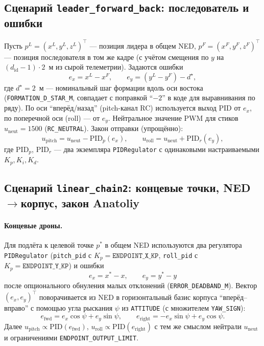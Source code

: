 \documentclass[12pt,a4paper]{article}
\begin{document}
\subsection{Сценарий \texttt{leader\_forward\_back}: последователь и ошибки}

Пусть $p^L = (x^L, y^L, z^L)^\top$ --- позиция лидера в общем NED, $p^F = (x^F, y^F, z^F)^\top$ --- позиция последователя в том же кадре (с учётом смещения по $y$ на $(d_{\mathrm{id}}-1)\cdot 2$~м из сырой телеметрии). Задаются ошибки
\begin{equation}
  e_x = x^L - x^F, \qquad
  e_y = (y^L - y^F) - d^\star,
\end{equation}
где $d^\star = 2$~м --- номинальный шаг формации вдоль оси востока (\texttt{FORMATION\_D\_STAR\_M}, совпадает с поправкой ``$-2$'' в коде для выравнивания по ряду). По оси ``вперёд/назад'' (pitch-канал RC) используется выход PID от $e_x$, по поперечной оси (roll) --- от $e_y$. Нейтральное значение PWM для стиков $u_{\mathrm{neut}} = 1500$ (\texttt{RC\_NEUTRAL}). Закон отправки (упрощённо):
\begin{equation}
  u_{\mathrm{pitch}} = u_{\mathrm{neut}} - \mathrm{PID}_p(e_x), \qquad
  u_{\mathrm{roll}} = u_{\mathrm{neut}} + \mathrm{PID}_r(e_y),
\end{equation}
где $\mathrm{PID}_p$, $\mathrm{PID}_r$ --- два экземпляра \texttt{PIDRegulator} с одинаковыми настраиваемыми $K_p,K_i,K_d$.

\subsection{Сценарий \texttt{linear\_chain2}: концевые точки, NED$\to$корпус, закон Anatoliy}

\paragraph{Концевые дроны.}
Для подлёта к целевой точке $p^\ast$ в общем NED используются два регулятора \texttt{PIDRegulator} (\texttt{pitch\_pid} с $K_p = \texttt{ENDPOINT\_X\_KP}$, \texttt{roll\_pid} с $K_p = \texttt{ENDPOINT\_Y\_KP}$) и ошибки
\begin{equation}
  e_x = x^\ast - x, \qquad e_y = y^\ast - y
\end{equation}
после опционального обнуления малых отклонений (\texttt{ERROR\_DEADBAND\_M}). Вектор $(e_x, e_y)^\top$ поворачивается из NED в горизонтальный базис корпуса ``вперёд--вправо'' с помощью угла рыскания $\psi$ из \texttt{ATTITUDE} (с множителем \texttt{YAW\_SIGN}):
\begin{equation}
  e_{\mathrm{fwd}} = e_x \cos\psi + e_y \sin\psi, \qquad
  e_{\mathrm{right}} = -e_x \sin\psi + e_y \cos\psi.
\end{equation}
Далее $u_{\mathrm{pitch}} \propto \mathrm{PID}(e_{\mathrm{fwd}})$, $u_{\mathrm{roll}} \propto \mathrm{PID}(e_{\mathrm{right}})$ с тем же смыслом нейтрали $u_{\mathrm{neut}}$ и ограничениями \texttt{ENDPOINT\_OUTPUT\_LIMIT}.
\end{document}
